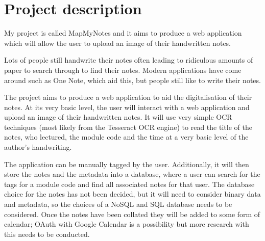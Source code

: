 \documentclass[11pt,fleqn,twoside]{article}
\begin{document}
\wordcount{}

\mmp

\setcounter{tocdepth}{3} %


\section{Project description}
My project is called MapMyNotes and it aims to produce a web application which will allow the user to upload an image of their handwritten notes.

Lots of people still handwrite their notes often leading to ridiculous amounts of paper to search through to find their notes. Modern applications have come around such as One Note, which aid this, but people still like to write their notes.

The project aims to produce a web application to aid the digitalisation of their notes. At its very basic level, the user will interact with a web application and upload an image of their handwritten notes. It will use very simple OCR techniques (most likely from the Tesseract OCR engine) to read the title of the notes, who lectured, the module code and the time at a very basic level of the author's handwriting.

The application can be manually tagged by the user. Additionally, it will then store the notes and the metadata into a database, where a user can search for the tags for a module code and find all associated notes for that user. The database choice for the notes has not been decided, but it will need to consider binary data and metadata, so the choices of a NoSQL and SQL database needs to be considered. Once the notes have been collated they will be added to some form of calendar; OAuth with Google Calendar is a possibility but more research with this needs to be conducted.
\end{document}
